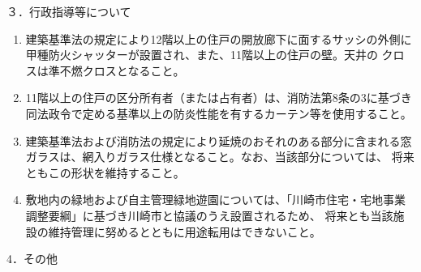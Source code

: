 \documentclass[
  twoside,
  luatex,
  paper=a4paper,
  fontsize=11pt,
  jafontsize=11pt,
  jlreq_notes,
]{jlreq}
\begin{document}
  ３．行政指導等について
  \begin{enumerate}
  \item 建築基準法の規定により12階以上の住戸の開放廊下に面するサッシの外側に甲種防火シャッターが設置され、また、11階以上の住戸の壁。天井の クロスは準不燃クロスとなること。
  \item 11階以上の住戸の区分所有者（または占有者）は、消防法第8条の3に基づき同法政令で定める基準以上の防炎性能を有するカーテン等を使用すること。
  \item 建築基準法および消防法の規定により延焼のおそれのある部分に含まれる窓ガラスは、網入りガラス仕様となること。なお、当該部分については、
        将来ともこの形状を維持すること。
  \item 敷地内の緑地および自主管理緑地遊園については、「川崎市住宅・宅地事業調整要綱」に基づき川崎市と協議のうえ設置されるため、
        将来とも当該施設の維持管理に努めるとともに用途転用はできないこと。
  \end{enumerate}
  4．その他
\end{document}

